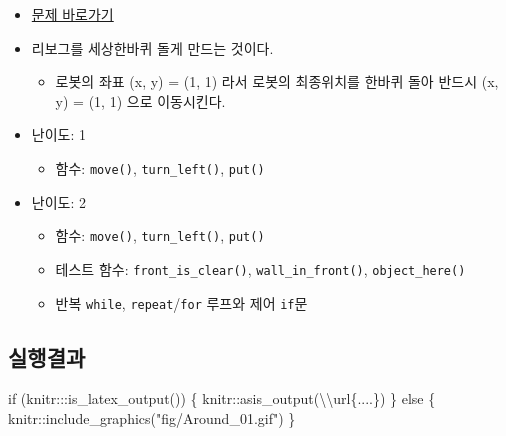 \documentclass[
  b5paperpaper,
  DIV=11,
  numbers=noendperiod]{scrreprt}
\newenvironment{Shaded}{\begin{snugshade}}{\end{snugshade}}
\newcommand{\ControlFlowTok}[1]{\textcolor[rgb]{0.00,0.23,0.31}{#1}}
\newcommand{\FunctionTok}[1]{\textcolor[rgb]{0.28,0.35,0.67}{#1}}
\newcommand{\NormalTok}[1]{\textcolor[rgb]{0.00,0.23,0.31}{#1}}
\newcommand{\SpecialCharTok}[1]{\textcolor[rgb]{0.37,0.37,0.37}{#1}}
\newcommand{\StringTok}[1]{\textcolor[rgb]{0.13,0.47,0.30}{#1}}
\providecommand{\tightlist}{%
  \setlength{\itemsep}{0pt}\setlength{\parskip}{0pt}}\usepackage{longtable,booktabs,array}
\begin{document}
\begin{itemize}
\tightlist
\item
  \href{https://reeborg.ca/reeborg.html?lang=ko-en\&mode=python\&menu=worlds\%2Fmenus\%2Freeborg_intro_en.json\&name=Around\%201\&url=worlds\%2Ftutorial_en\%2Faround1.json}{문제
  바로가기}
\item
  리보그를 세상한바퀴 돌게 만드는 것이다.

  \begin{itemize}
  \tightlist
  \item
    로봇의 좌표 (x, y) = (1, 1) 라서 로봇의 최종위치를 한바퀴 돌아
    반드시 (x, y) = (1, 1) 으로 이동시킨다.
  \end{itemize}
\item
  난이도: 1

  \begin{itemize}
  \tightlist
  \item
    함수: \texttt{move()}, \texttt{turn\_left()}, \texttt{put()}
  \end{itemize}
\item
  난이도: 2

  \begin{itemize}
  \tightlist
  \item
    함수: \texttt{move()}, \texttt{turn\_left()}, \texttt{put()}
  \item
    테스트 함수: \texttt{front\_is\_clear()},
    \texttt{wall\_in\_front()}, \texttt{object\_here()}
  \item
    반복 \texttt{while}, \texttt{repeat}/\texttt{for} 루프와 제어
    \texttt{if}문
  \end{itemize}
\end{itemize}

\hypertarget{uxc2e4uxd589uxacb0uxacfc-5}{%
\subsection{실행결과}\label{uxc2e4uxd589uxacb0uxacfc-5}}

\begin{Shaded}
\begin{Highlighting}[]
\ControlFlowTok{if}\NormalTok{ (knitr}\SpecialCharTok{:::}\FunctionTok{is\_latex\_output}\NormalTok{()) \{}
\NormalTok{  knitr}\SpecialCharTok{::}\FunctionTok{asis\_output}\NormalTok{(}\StringTok{\textquotesingle{}}\SpecialCharTok{\textbackslash{}\textbackslash{}}\StringTok{url\{....\}\textquotesingle{}}\NormalTok{)}
\NormalTok{\} }\ControlFlowTok{else}\NormalTok{ \{}
\NormalTok{  knitr}\SpecialCharTok{::}\FunctionTok{include\_graphics}\NormalTok{(}\StringTok{"fig/Around\_01.gif"}\NormalTok{)}
\NormalTok{\}}
\end{Highlighting}
\end{Shaded}
\end{document}
